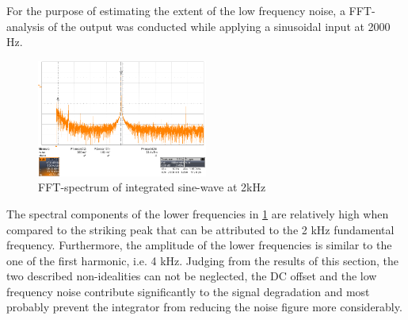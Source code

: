For the purpose of estimating the extent of the low frequency noise, a FFT-analysis of the output was conducted while applying a sinusoidal input at 2000 Hz.

\begin{figure}[htbp]
 \centering
 \centerline{\includegraphics[width=0.5\textwidth]{figures/Results/Noisespectrum/sin2k-0_02v}}

  \caption[Kurze Abbildungsbeschreibung]{FFT-spectrum of integrated sine-wave at 2kHz}
\label{fig.noisefft}
\end{figure}

The spectral components of the lower frequencies in \ref{fig.noisefft} are relatively high when compared to the striking peak that can be attributed to the 2 kHz fundamental frequency.
Furthermore, the amplitude of the lower frequencies is similar to the one of the first harmonic, i.e. 4 kHz.
Judging from the results of this section, the two described non-idealities can not be neglected, the DC offset and the low frequency noise contribute significantly to the signal degradation and
most probably prevent the integrator from reducing the noise figure more considerably.




